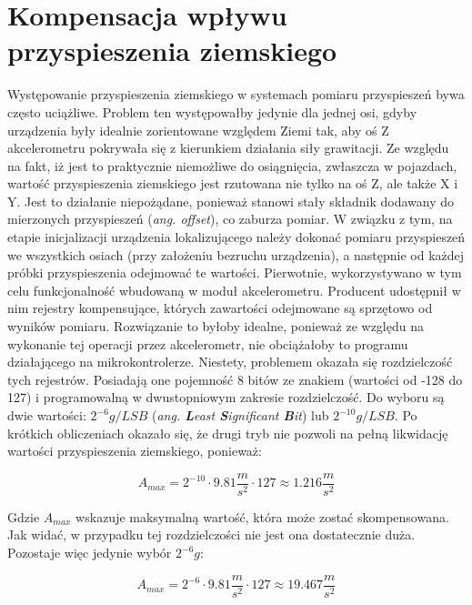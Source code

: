 \clearpage
\section{Kompensacja wpływu przyspieszenia ziemskiego}

Występowanie przyspieszenia ziemskiego w systemach pomiaru przyspieszeń bywa często uciążliwe. Problem ten występowałby jedynie dla jednej osi, gdyby urządzenia były idealnie zorientowane względem Ziemi tak, aby oś Z akcelerometru pokrywała się z kierunkiem działania siły grawitacji. Ze względu na fakt, iż jest to praktycznie niemożliwe do osiągnięcia, zwłaszcza w pojazdach, wartość przyspieszenia ziemskiego jest rzutowana nie tylko na oś Z, ale także X i Y. Jest to działanie niepożądane, ponieważ stanowi stały składnik dodawany do mierzonych przyspieszeń (\textit{ang. offset}), co zaburza pomiar. W związku z tym, na etapie inicjalizacji urządzenia lokalizującego należy dokonać pomiaru przyspieszeń we wszystkich osiach (przy założeniu bezruchu urządzenia), a następnie od każdej próbki przyspieszenia odejmować te wartości.
Pierwotnie, wykorzystywano w tym celu funkcjonalność wbudowaną w moduł akcelerometru. Producent udostępnił w nim rejestry kompensujące, których zawartości odejmowane są sprzętowo od wyników pomiaru. Rozwiązanie to byłoby idealne, ponieważ ze względu na wykonanie tej operacji przez akcelerometr, nie obciążałoby to programu działającego na mikrokontrolerze. Niestety, problemem okazała się rozdzielczość tych rejestrów. Posiadają one pojemność 8 bitów ze znakiem (wartości od -128 do 127) i programowalną w dwustopniowym zakresie rozdzielczość. Do wyboru są dwie wartości: $2^{-6}g/LSB$ (\textit{ang. \textbf{L}east \textbf{S}ignificant \textbf{B}it}) lub $2^{-10}g/LSB$. 
Po krótkich obliczeniach okazało się, że drugi tryb nie pozwoli na pełną likwidację wartości przyspieszenia ziemskiego, ponieważ:

\begin{equation}
A_{max} = 2^{-10} \cdot 9.81\frac{m}{s^2} \cdot 127 \approx 1.216 \frac{m}{s^2}
\end{equation}

Gdzie $A_{max}$ wskazuje maksymalną wartość, która może zostać skompensowana. Jak widać, w przypadku tej rozdzielczości nie jest ona dostatecznie duża. Pozostaje więc jedynie wybór $2^{-6} g$:

\begin{equation}
A_{max} = 2^{-6} \cdot 9.81\frac{m}{s^2} \cdot 127 \approx 19.467 \frac{m}{s^2}
\end{equation}

